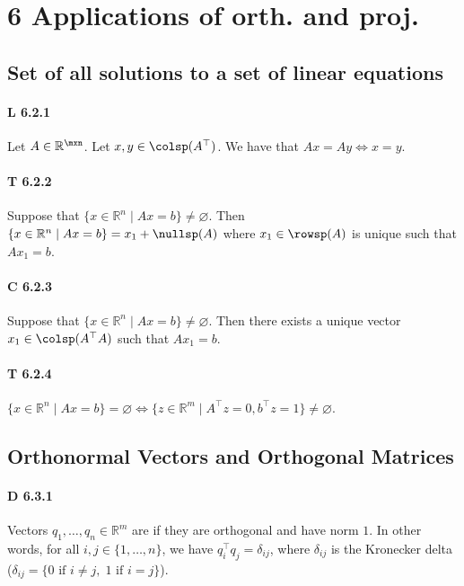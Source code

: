 \section*{6 Applications of orth. and proj.}

\subsection{Set of all solutions to a set of linear equations}

\paragraph{L 6.2.1} Let $A\in\mathbb{R}^{\mxn}$. Let $x,y \in\colsp(A^\top)$.
We have that $Ax=Ay \Longleftrightarrow x=y$.

\paragraph{T 6.2.2} Suppose that $\{x\in\mathbb{R}^n\mid Ax=b\}\ne \varnothing$.
Then $\{x\in\mathbb{R}^n\mid Ax=b\}=x_1+\nullsp(A)$ where $x_1 \in \rowsp(A)$ is
unique such that $Ax_1 = b$.

\paragraph{C 6.2.3} Suppose that $\{x\in\mathbb{R}^n\mid Ax=b\}\ne \varnothing$.
Then there exists a unique vector $x_1\in \colsp(A^\top A)$ such that $Ax_1 = b$.

\paragraph{T 6.2.4} $\{x\in\mathbb{R}^n\mid Ax=b\} = \varnothing
\Longleftrightarrow \{z \in \mathbb{R}^m \mid A^\top z = 0, b^\top z = 1\}\ne
\varnothing$.

\subsection{Orthonormal Vectors and Orthogonal Matrices}

\paragraph{D 6.3.1} Vectors $q_1,\dots,q_n\in\mathbb{R}^m$
are  if they are orthogonal and have norm $1$. In other words,
for all $i,j\in\{1,\dots,n\}$, we have $q_i^\top q_j=\delta_{ij}$,
where $\delta_{ij}$ is the Kronecker delta
($\delta_{ij}=\{0\text{ if }i\neq j,\;1\text{ if }i=j\}$).

